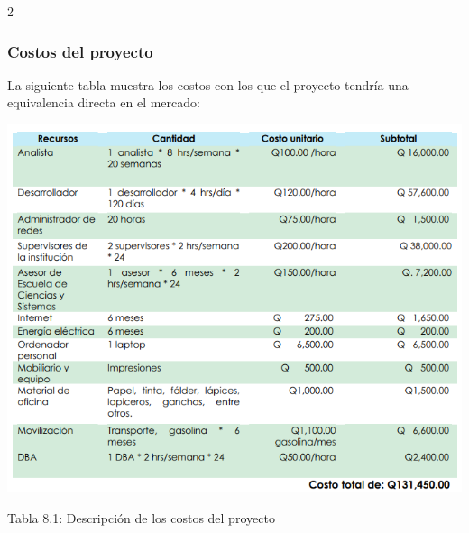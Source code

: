 \documentclass[12pt,spanish,Letterpaper,openany]{book}
\begin{document}
\begin {multicols}{2}
\hypertarget{costos-del-proyecto}{%
\subsubsection{Costos del proyecto}\label{costos-del-proyecto}}

La siguiente tabla muestra los costos con los que el proyecto tendría una
equivalencia directa en el mercado:

\end {multicols}

\begin {center}

\noindent\begin{minipage}[c]{\columnwidth}
\centering

\begin{center}\includegraphics[width=0.5\linewidth]{images/06_07} \end{center}
\vspace{0.01cm}
\footnotesize
\centering

Tabla 8.1: Descripción de los costos del proyecto

\end{minipage}

\end {center}
\end{document}
